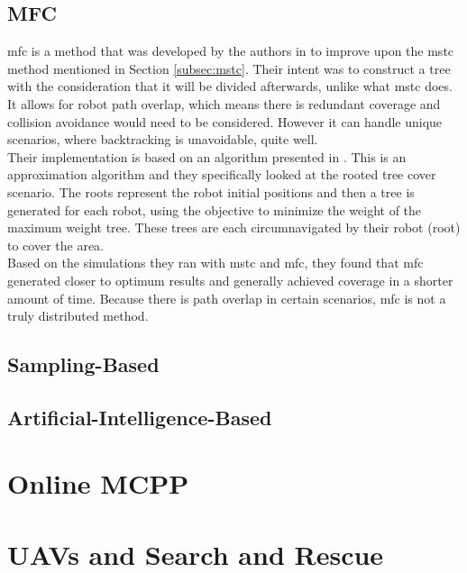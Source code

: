 \subsection{MFC}
\ac{mfc} is a method that was developed by the authors in \cite{Zheng2005} to improve upon the \ac{mstc} method mentioned in Section \ref{subsec:mstc}. Their intent was to construct a tree with the consideration that it will be divided afterwards, unlike what \ac{mstc} does. It allows for robot path overlap, which means there is redundant coverage and collision avoidance would need to be considered. However it can handle unique scenarios, where backtracking is unavoidable, quite well.\\ 
Their implementation is based on an algorithm presented in \cite{Even2003}. This is an approximation algorithm and they specifically looked at the rooted tree cover scenario. The roots represent the robot initial positions and then a tree is generated for each robot, using the objective to minimize the weight of the maximum weight tree. These trees are each circumnavigated by their robot (root) to cover the area.\\
Based on the simulations they ran with \ac{mstc} and \ac{mfc}, they found that \ac{mfc} generated closer to optimum results and generally achieved coverage in a shorter amount of time.	Because there is path overlap in certain scenarios, \ac{mfc} is not a truly distributed method.
\subsection{Sampling-Based}
\subsection{Artificial-Intelligence-Based}

\section{Online MCPP}
\label{sec:lit Online MCPP}
\section{UAVs and Search and Rescue}


